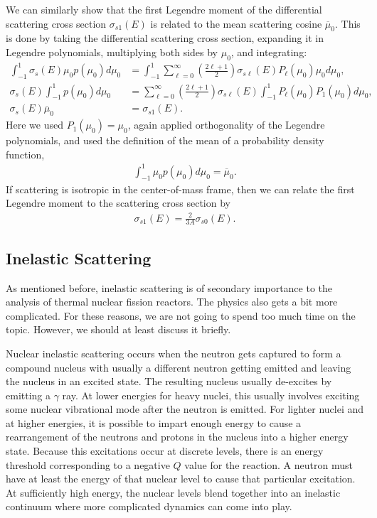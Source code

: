 We can similarly show that the first Legendre moment of the differential scattering cross section $\sigma_{s1}(E)$ is related to the mean scattering cosine $\overline{\mu}_0$. This is done by taking the differential scattering cross section, expanding it in Legendre polynomials, multiplying both sides by $\mu_0$, and integrating:
\begin{align}
   \int_{-1}^1 \sigma_s(E) \mu_0 p(\mu_0) d\mu_0 &= \int_{-1}^1 \sum_{\ell=0}^\infty \left( \frac{2\ell + 1}{2} \right) \sigma_{s\ell}(E) P_\ell(\mu_0) \mu_0  d\mu_0 , \nonumber \\
    \sigma_s(E) \int_{-1}^1  p(\mu_0) d\mu_0 &=  \sum_{\ell=0}^\infty \left( \frac{2\ell + 1}{2} \right) \sigma_{s\ell}(E) \int_{-1}^1 P_\ell(\mu_0) P_1(\mu_0) d\mu_0 , \nonumber \\  
    \sigma_s(E) \overline{\mu}_0 &= \sigma_{s1}(E)  .
\end{align}
Here we used $P_1(\mu_0) = \mu_0$, again applied orthogonality of the Legendre polynomials, and used the definition of the mean of a probability density function,
\begin{align}
  \int_{-1}^1 \mu_0 p(\mu_0) d\mu_0 = \overline{\mu}_0 . \nonumber
\end{align}
If scattering is isotropic in the center-of-mass frame, then we can relate the first Legendre moment to the scattering cross section by
\begin{align}
  \sigma_{s1}(E) = \frac{2}{3A} \sigma_{s0}(E) .
\end{align}

\subsection{Inelastic Scattering}

As mentioned before, inelastic scattering is of secondary importance to the analysis of thermal nuclear fission reactors. The physics also gets a bit more complicated. For these reasons, we are not going to spend too much time on the topic. However, we should at least discuss it briefly.

Nuclear inelastic scattering occurs when the neutron gets captured to form a compound nucleus with usually a different neutron getting emitted and leaving the nucleus in an excited state. The resulting nucleus usually de-excites by emitting a $\gamma$ ray. At lower energies for heavy nuclei, this usually involves exciting some nuclear vibrational mode after the neutron is emitted. For lighter nuclei and at higher energies, it is possible to impart enough energy to cause a rearrangement of the neutrons and protons in the nucleus into a higher energy state. Because this excitations occur at discrete levels, there is an energy threshold corresponding to a negative $Q$ value for the reaction. A neutron must have at least the energy of that nuclear level to cause that particular excitation. At sufficiently high energy, the nuclear levels blend together into an inelastic continuum where more complicated dynamics can come into play.


